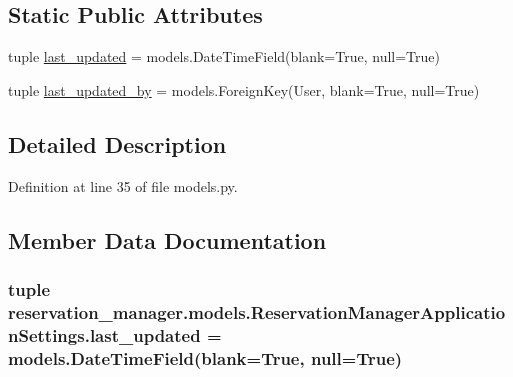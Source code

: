 \subsection*{Static Public Attributes}
\begin{DoxyCompactItemize}
\item 
tuple \hyperlink{classreservation__manager_1_1models_1_1ReservationManagerApplicationSettings_af53fbc7220b5d3926e1fec21590f31a0}{last\-\_\-updated} = models.\-Date\-Time\-Field(blank=True, null=True)
\item 
tuple \hyperlink{classreservation__manager_1_1models_1_1ReservationManagerApplicationSettings_a4ea13db7d9bad10f39115cb98342d534}{last\-\_\-updated\-\_\-by} = models.\-Foreign\-Key(User, blank=True, null=True)
\end{DoxyCompactItemize}


\subsection{Detailed Description}


Definition at line 35 of file models.\-py.



\subsection{Member Data Documentation}
\hypertarget{classreservation__manager_1_1models_1_1ReservationManagerApplicationSettings_af53fbc7220b5d3926e1fec21590f31a0}{
\subsubsection[{last\-\_\-updated}]{\setlength{\rightskip}{0pt plus 5cm}tuple reservation\-\_\-manager.\-models.\-Reservation\-Manager\-Application\-Settings.\-last\-\_\-updated = models.\-Date\-Time\-Field(blank=True, null=True)\hspace{0.3cm}{\ttfamily [static]}}}\label{classreservation__manager_1_1models_1_1ReservationManagerApplicationSettings_af53fbc7220b5d3926e1fec21590f31a0}


